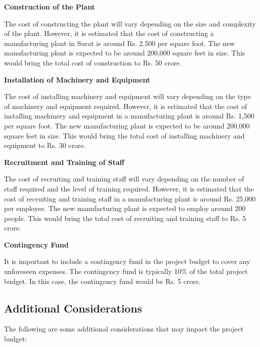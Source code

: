 \textbf{Construction of the Plant}

The cost of constructing the plant will vary depending on the size and complexity of the plant. However, it is estimated that the cost of constructing a manufacturing plant in Surat is around Rs. 2,500 per square foot. The new manufacturing plant is expected to be around 200,000 square feet in size. This would bring the total cost of construction to Rs. 50 crore.

\textbf{Installation of Machinery and Equipment}

The cost of installing machinery and equipment will vary depending on the type of machinery and equipment required. However, it is estimated that the cost of installing machinery and equipment in a manufacturing plant is around Rs. 1,500 per square foot. The new manufacturing plant is expected to be around 200,000 square feet in size. This would bring the total cost of installing machinery and equipment to Rs. 30 crore.

\textbf{Recruitment and Training of Staff}

The cost of recruiting and training staff will vary depending on the number of staff required and the level of training required. However, it is estimated that the cost of recruiting and training staff in a manufacturing plant is around Rs. 25,000 per employee. The new manufacturing plant is expected to employ around 200 people. This would bring the total cost of recruiting and training staff to Rs. 5 crore.

\textbf{Contingency Fund}

It is important to include a contingency fund in the project budget to cover any unforeseen expenses. The contingency fund is typically 10\% of the total project budget. In this case, the contingency fund would be Rs. 5 crore.


\subsection{Additional Considerations}

The following are some additional considerations that may impact the project budget:

